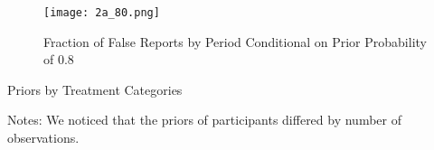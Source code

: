 \documentclass[12pt,a4paper]{article}
\begin{document}
	\begin{figure}
		\centering
		\texttt{[image: 2a\_80.png]}
		\caption{Fraction of False Reports by Period Conditional on Prior Probability of 0.8} \label{tab:F6}
		\label{fig:enter-label}
	\end{figure}
	
	
	\newpage
	
	\begin{table}[H]
		\centering
		\caption{Priors by Treatment Categories} \label{tab:table1}
		\begin{threeparttable}
			\footnotesize 
			 
			\begin{tablenotes}
				\scriptsize 
				\item{Notes: We noticed that the priors of participants differed by number of observations.
				}
			\end{tablenotes}  
		\end{threeparttable}                          
	\end{table}
	
\end{document}
